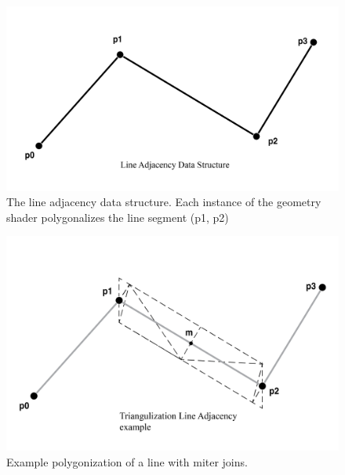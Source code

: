 \documentclass[11pt]{report}
\begin{document}
\begin{figure}
	\begin{center}
		\includegraphics[width=\textwidth]{lineadjacency.png}
	\end{center}
	\caption{The line adjacency data structure. Each instance of the geometry shader polygonalizes the line segment (p1, p2)}
\end{figure}
\begin{figure}
	\includegraphics[width=\textwidth]{linepolyex.png}
	\caption{Example polygonization of a line with miter joins.}
\end{figure}
\end{document}
